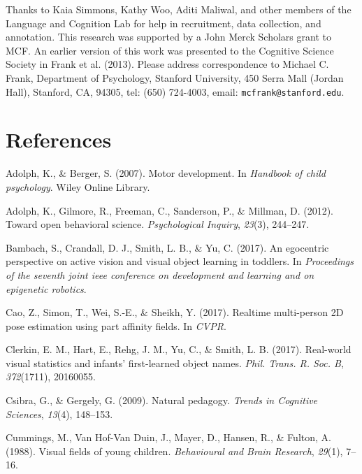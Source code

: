 \documentclass[10pt, letterpaper]{article}
\begin{document}
Thanks to Kaia Simmons, Kathy Woo, Aditi Maliwal, and other members of
the Language and Cognition Lab for help in recruitment, data collection,
and annotation. This research was supported by a John Merck Scholars
grant to MCF. An earlier version of this work was presented to the
Cognitive Science Society in Frank et al. (2013). Please address
correspondence to Michael C. Frank, Department of Psychology, Stanford
University, 450 Serra Mall (Jordan Hall), Stanford, CA, 94305, tel:
(650) 724-4003, email: \texttt{mcfrank@stanford.edu}.

\section{References}\label{references}

\setlength{\parindent}{-0.1in} \setlength{\leftskip}{0.125in} \noindent

\hypertarget{refs}{}
\hypertarget{ref-adolph2007}{}
Adolph, K., \& Berger, S. (2007). Motor development. In \emph{Handbook
of child psychology}. Wiley Online Library.

\hypertarget{ref-adolph2012}{}
Adolph, K., Gilmore, R., Freeman, C., Sanderson, P., \& Millman, D.
(2012). Toward open behavioral science. \emph{Psychological Inquiry},
\emph{23}(3), 244--247.

\hypertarget{ref-bambach2017}{}
Bambach, S., Crandall, D. J., Smith, L. B., \& Yu, C. (2017). An
egocentric perspective on active vision and visual object learning in
toddlers. In \emph{Proceedings of the seventh joint ieee conference on
development and learning and on epigenetic robotics}.

\hypertarget{ref-cao2017realtime}{}
Cao, Z., Simon, T., Wei, S.-E., \& Sheikh, Y. (2017). Realtime
multi-person 2D pose estimation using part affinity fields. In
\emph{CVPR}.

\hypertarget{ref-clerkin2017}{}
Clerkin, E. M., Hart, E., Rehg, J. M., Yu, C., \& Smith, L. B. (2017).
Real-world visual statistics and infants' first-learned object names.
\emph{Phil. Trans. R. Soc. B}, \emph{372}(1711), 20160055.

\hypertarget{ref-csibra2009natural}{}
Csibra, G., \& Gergely, G. (2009). Natural pedagogy. \emph{Trends in
Cognitive Sciences}, \emph{13}(4), 148--153.

\hypertarget{ref-cummings1988}{}
Cummings, M., Van Hof-Van Duin, J., Mayer, D., Hansen, R., \& Fulton, A.
(1988). Visual fields of young children. \emph{Behavioural and Brain
Research}, \emph{29}(1), 7--16.
\end{document}
